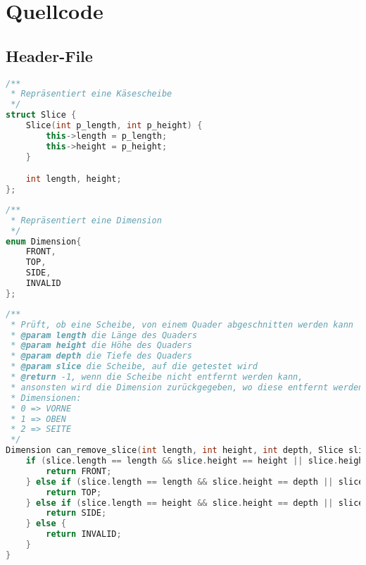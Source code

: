 \documentclass[a4paper,10pt,ngerman]{scrartcl}
\begin{document}
    \section{Quellcode}
    \label{sec:quellcode}
    \label{LastPage}

    \subsection{Header-File}\label{subsec:header-file}

    \begin{lstlisting}[frame=single,language=C++,title=Struct Slice,breaklines=true,label={lst:code_slice}]
/**
 * Repräsentiert eine Käsescheibe
 */
struct Slice {
    Slice(int p_length, int p_height) {
        this->length = p_length;
        this->height = p_height;
    }

    int length, height;
};
    \end{lstlisting}

    \begin{lstlisting}[frame=single,language=C++,title=Enum Dimension,breaklines=true,label={lst:code_dimension}]
/**
 * Repräsentiert eine Dimension
 */
enum Dimension{
    FRONT,
    TOP,
    SIDE,
    INVALID
};
    \end{lstlisting}

    \begin{lstlisting}[frame=single,language=C++,title=Methode can\_remove\_slice,breaklines=true,label={lst:code_canRemoveSlice}]
/**
 * Prüft, ob eine Scheibe, von einem Quader abgeschnitten werden kann
 * @param length die Länge des Quaders
 * @param height die Höhe des Quaders
 * @param depth die Tiefe des Quaders
 * @param slice die Scheibe, auf die getestet wird
 * @return -1, wenn die Scheibe nicht entfernt werden kann,
 * ansonsten wird die Dimension zurückgegeben, wo diese entfernt werden kann
 * Dimensionen:
 * 0 => VORNE
 * 1 => OBEN
 * 2 => SEITE
 */
Dimension can_remove_slice(int length, int height, int depth, Slice slice) {
    if (slice.length == length && slice.height == height || slice.height == length && slice.length == height) {
        return FRONT;
    } else if (slice.length == length && slice.height == depth || slice.height == length && slice.length == depth) {
        return TOP;
    } else if (slice.length == height && slice.height == depth || slice.height == height && slice.length == depth) {
        return SIDE;
    } else {
        return INVALID;
    }
}
    \end{lstlisting}
\end{document}

